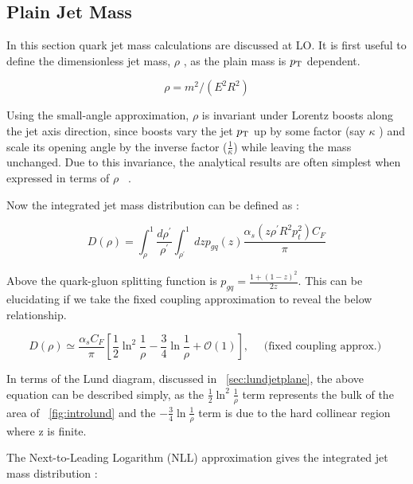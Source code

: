 \subsection{Plain Jet Mass }\label{sec:jetmass}


In this section quark jet mass calculations are discussed at LO. It is first useful to define the dimensionless jet mass, $\rho$ , as the plain mass is $p_{\mathrm{T}}$ dependent.


\begin{equation}
\rho=m^{2} /\left(E^{2} R^{2}\right)
\end{equation}



Using the small-angle approximation, $\rho$ is invariant under Lorentz boosts along the jet axis direction, since boosts vary the jet $p_{\mathrm{T}}$ up by some factor (say $\kappa$ ) and scale its opening angle by the inverse factor ($\frac{1}{\kappa}$) while leaving the mass unchanged. Due to this invariance, the analytical results are often simplest when expressed in terms of $\rho$ ~\cite{mmdt}.

Now the integrated jet mass distribution can be defined as :\newline

\begin{equation}
D(\rho)=\int_{\rho}^{1} \frac{d \rho^{\prime}}{\rho^{\prime}} \int_{\rho^{\prime}}^{1} d z p_{g q}(z) \frac{\alpha_{s}\left(z \rho^{\prime} R^{2} p_{t}^{2}\right) C_{F}}{\pi}
\end{equation}


Above the quark-gluon splitting function is $p_{g q}=\frac{1+(1-z)^{2}}{2 z}$. This can be elucidating if we take the fixed coupling approximation to reveal the below relationship.~\cite{mmdt}


\begin{equation}
D(\rho) \simeq \frac{\alpha_{s} C_{F}}{\pi}\left[\frac{1}{2} \ln ^{2} \frac{1}{\rho}-\frac{3}{4} \ln \frac{1}{\rho}+\mathcal{O}(1)\right], \quad \text { (fixed coupling approx.) }
\end{equation}

In terms of the Lund diagram, discussed in ~\ref{sec:lundjetplane}, the above equation can be described simply, as the $\frac{1}{2} \ln ^{2} \frac{1}{\rho}$ term represents the bulk of the area of ~\ref{fig:introlund} and the $-\frac{3}{4} \ln \frac{1}{\rho}$ term is due to the hard collinear region where z is finite.


The Next-to-Leading Logarithm (NLL) approximation gives the integrated jet mass distribution :\newline


